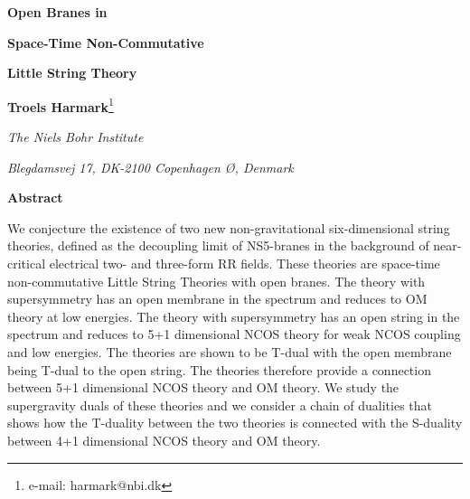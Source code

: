 \documentclass[a4paper,twoside,titlepage,12pt]{article}
\begin{document}
\begin{titlepage}

\vskip 2cm

\centerline{\Large \bf Open Branes in}
\vskip 0.2cm
\centerline{\Large \bf Space-Time Non-Commutative}
\vskip 0.2cm
\centerline{\Large \bf Little String Theory}
\vskip 0.2cm

\vskip 1.7cm
\centerline{{\bf Troels Harmark}\footnote{e-mail: harmark@nbi.dk}}
\vskip 0.3cm
\centerline{\sl The Niels Bohr Institute}
\centerline{\sl Blegdamsvej 17, DK-2100 Copenhagen \O, Denmark}
\vskip 1.7cm
\centerline{\bf Abstract}
\vskip 0.4cm

\noindent

We conjecture the existence of two new non-gravitational
six-dimensional string theories, defined as the decoupling limit
of NS5-branes in the background of near-critical electrical 
two- and three-form RR fields.
These theories are space-time non-commutative Little String Theories 
with open branes.
The theory with \coordHE{} supersymmetry has an open membrane
in the spectrum and reduces to OM theory at low energies.
The theory with \coordHE{} supersymmetry has an open string 
in the spectrum and reduces to 5+1 dimensional NCOS theory for 
weak NCOS coupling and low energies.
The theories are shown to be T-dual with
the open membrane being T-dual to the open string.
The theories therefore provide a connection 
between 5+1 dimensional NCOS theory and OM theory.
We study the supergravity duals of these theories and
we consider a chain of dualities that shows how the T-duality
between the two theories is connected with the S-duality between
4+1 dimensional NCOS theory and OM theory.


\end{titlepage}


\providecommand{\nn}{\nonumber}
\providecommand{\spa}{\ \ ,\ \ \ \ }
\providecommand{\str}{\mathop{{\rm Str}}}
\providecommand{\tr}{\mathop{{\rm Tr}}}
\providecommand{\sn}{\mathop{{\rm sn}}}

\providecommand{\gym}{g_{\mathrm{YM}}}
\providecommand{\geff}{g_{\mathrm{eff}}}
\providecommand{\gseff}{g_s^{\mathrm{eff}}}
\providecommand{\Ord}{{\cal{O}}}
\providecommand{\tlst}{T_{\rm LST}}
\providecommand{\tncos}{T_{\rm NCOS}}
\providecommand{\lsb}{\bar{l}_s}
\providecommand{\gsba}{\bar{g}_a}
\providecommand{\gsbb}{\bar{g}_b}
\providecommand{\lsn}{l_s}
\providecommand{\gsna}{g_a}
\providecommand{\gsnb}{g_b}
\providecommand{\lnc}{l_{\rm nc}}
\providecommand{\lm}{l_m}
\providecommand{\uncos}{u_{\rm NCOS}}
\end{document}
